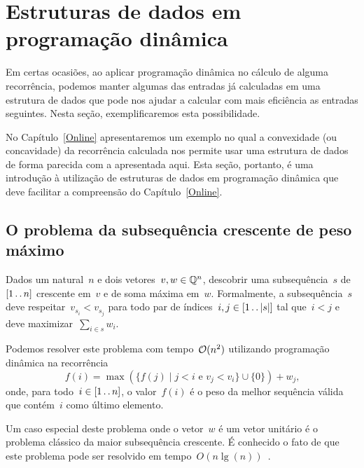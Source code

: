 \chapter{Estruturas de dados em programação dinâmica}
\label{EDPD}

Em certas ocasiões, ao aplicar programação dinâmica no cálculo de alguma recorrência, podemos manter algumas das entradas já calculadas em uma estrutura de dados que pode nos ajudar a calcular com mais eficiência as entradas seguintes. Nesta seção, exemplificaremos esta possibilidade. 

No Capítulo~\ref{Online} apresentaremos um exemplo no qual a convexidade (ou concavidade) da recorrência calculada nos permite usar uma estrutura de dados de forma parecida com a apresentada aqui. Esta seção, portanto, é uma introdução à utilização de estruturas de dados em programação dinâmica que deve facilitar a compreensão do Capítulo~\ref{Online}.


\section{O problema da subsequência crescente de peso máximo}

\begin{prob} \label{EDPD:HIS}
Dados um natural~$n$ e dois vetores~${ v,w \in \mathbb{Q}^n }$, descobrir uma subsequência~$s$ de~$[1 \,.\,.\, n]$ crescente em~$v$ e de soma máxima em~$w$. Formalmente, a subsequência~$s$ deve respeitar~${ v_{s_i} < v_{s_j} }$ para todo par de índices~${ i,j \in [1 \,.\,.\, |s|] }$ tal que~${ i < j }$ e deve maximizar~${ \sum\limits_{i \in s} w_i }$.
\end{prob}

Podemos resolver este problema com tempo~$\mathcal{O}(n^2)$ utilizando programação dinâmica na recorrência
\begin{equation} \label{EDPD:HIS:rec}
f(i) = \max(\{f(j) \mid j < i \text{ e } v_j < v_i\} \cup \{0\}) + w_j \text{,}
\end{equation}
onde, para todo~$i \in [1 \,.\,.\, n]$, o valor~$f(i)$ é o peso da melhor sequência válida que contém~$i$ como último elemento.

Um caso especial deste problema onde o vetor~$w$ é um vetor unitário é o problema clássico da maior subsequência crescente. É conhecido o fato de que este problema pode ser resolvido em tempo~$O(n\lg(n))$~\cite{Fredman:1975}. 

